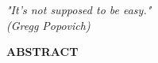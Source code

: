 \documentclass[12pt, %
               openright, %
               oneside, %
               a4paper, %
               chapter=TITLE, %
               section=TITLE, %
               brazil,
               english %
]{abntex2}
\begin{document}
\begin{epigrafe}
  \vspace*{\fill}
  \begin{flushright}
    \textit{"It's not supposed to be easy."\\
             (Gregg Popovich)}
  \end{flushright}
\end{epigrafe}
\newpage
\setlength{\absparsep}{18pt} %
\setlength{\abstitleskip}{1cm} %
\begin{resumo}[]
  \vspace{-2cm}
  \begin{center}
    \bfseries{\large{\textsf{ABSTRACT}}}
  \end{center}
  \vspace{0.3cm}
  

\end{resumo}
\end{document}
